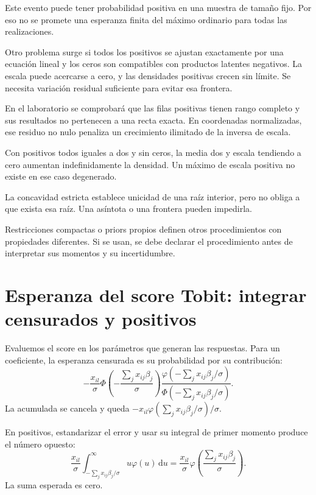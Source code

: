 \documentclass[11pt,a4paper]{article}
\newcommand{\dd}{\,\mathrm d}
\begin{document}
Este evento puede tener probabilidad positiva
en una muestra de tamaño fijo.
Por eso no se promete una
esperanza finita del máximo
ordinario para todas las realizaciones.

Otro problema surge si todos
los positivos se ajustan exactamente
por una ecuación lineal
y los ceros son compatibles
con productos latentes negativos.
La escala puede acercarse a cero,
y las densidades positivas
crecen sin límite.
Se necesita variación residual
suficiente para evitar esa frontera.

En el laboratorio se comprobará
que las filas positivas tienen
rango completo y sus resultados
no pertenecen a una recta exacta.
En coordenadas normalizadas,
ese residuo no nulo penaliza
un crecimiento ilimitado de
la inversa de escala.

\begin{ejemplo}
Con positivos todos iguales a dos
y sin ceros, la media dos
y escala tendiendo a cero
aumentan indefinidamente la densidad.
Un máximo de escala positiva
no existe en ese caso degenerado.
\end{ejemplo}
La concavidad estricta establece
unicidad de una raíz interior,
pero no obliga a que
exista esa raíz.
Una asíntota o una frontera
pueden impedirla.

Restricciones compactas o priors propios
definen otros procedimientos
con propiedades diferentes.
Si se usan, se debe
declarar el procedimiento
antes de interpretar sus
momentos y su incertidumbre.

\clearpage
\section{Esperanza del score Tobit: integrar censurados y positivos}\label{unidad100}
Evaluemos el score en los parámetros
que generan las respuestas.
Para un coeficiente, la esperanza
censurada es su probabilidad
por su contribución:
\[
-\frac{x_{il}}{\sigma}
\Phi\left(-\frac{\sum_jx_{ij}\beta_j}{\sigma}\right)
\frac{\varphi(-\sum_jx_{ij}\beta_j/\sigma)}
{\Phi(-\sum_jx_{ij}\beta_j/\sigma)}.
\]
La acumulada se cancela
y queda \(-x_{il}\varphi(\sum_jx_{ij}\beta_j/\sigma)/\sigma\).

En positivos, estandarizar el error
y usar su integral de primer momento
produce el número opuesto:
\[
\frac{x_{il}}{\sigma}
\int_{-\sum_jx_{ij}\beta_j/\sigma}^\infty
u\varphi(u)\dd u
=\frac{x_{il}}{\sigma}
\varphi\left(\frac{\sum_jx_{ij}\beta_j}{\sigma}\right).
\]
La suma esperada es cero.
\end{document}
